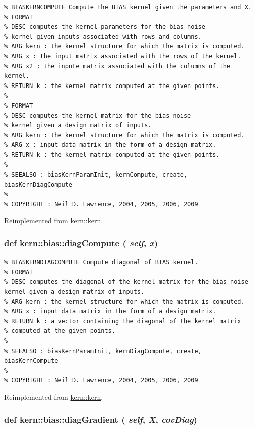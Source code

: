 \footnotesize\begin{verbatim}% BIASKERNCOMPUTE Compute the BIAS kernel given the parameters and X.
% FORMAT
% DESC computes the kernel parameters for the bias noise
% kernel given inputs associated with rows and columns.
% ARG kern : the kernel structure for which the matrix is computed.
% ARG x : the input matrix associated with the rows of the kernel.
% ARG x2 : the inpute matrix associated with the columns of the kernel.
% RETURN k : the kernel matrix computed at the given points.
%
% FORMAT
% DESC computes the kernel matrix for the bias noise
% kernel given a design matrix of inputs.
% ARG kern : the kernel structure for which the matrix is computed.
% ARG x : input data matrix in the form of a design matrix.
% RETURN k : the kernel matrix computed at the given points.
%
% SEEALSO : biasKernParamInit, kernCompute, create, biasKernDiagCompute
%
% COPYRIGHT : Neil D. Lawrence, 2004, 2005, 2006, 2009

\end{verbatim}
\normalsize
 

Reimplemented from \hyperlink{classkern_1_1kern}{kern::kern}.\hypertarget{classkern_1_1bias_9cb634c409600f556ee51e1205986859}{
\subsubsection[{diagCompute}]{\setlength{\rightskip}{0pt plus 5cm}def kern::bias::diagCompute ( {\em self}, \/   {\em x})}}
\label{classkern_1_1bias_9cb634c409600f556ee51e1205986859}




\footnotesize\begin{verbatim}% BIASKERNDIAGCOMPUTE Compute diagonal of BIAS kernel.
% FORMAT
% DESC computes the diagonal of the kernel matrix for the bias noise kernel given a design matrix of inputs.
% ARG kern : the kernel structure for which the matrix is computed.
% ARG x : input data matrix in the form of a design matrix.
% RETURN k : a vector containing the diagonal of the kernel matrix
% computed at the given points.
%
% SEEALSO : biasKernParamInit, kernDiagCompute, create, biasKernCompute
%
% COPYRIGHT : Neil D. Lawrence, 2004, 2005, 2006, 2009

\end{verbatim}
\normalsize
 

Reimplemented from \hyperlink{classkern_1_1kern}{kern::kern}.\hypertarget{classkern_1_1bias_06a7443d3cdcb0c7b433b452cb84f357}{
\subsubsection[{diagGradient}]{\setlength{\rightskip}{0pt plus 5cm}def kern::bias::diagGradient ( {\em self}, \/   {\em X}, \/   {\em covDiag})}}
\label{classkern_1_1bias_06a7443d3cdcb0c7b433b452cb84f357}




